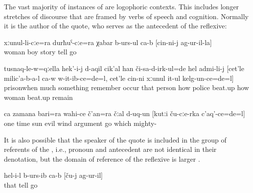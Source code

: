 The vast majority of instances of  are logophoric contexts. This includes longer stretches of discourse that are framed by verbs of speech and cognition. Normally it is the author of the quote, who serves as the antecedent of the reflexive:
%
\begin{exe}

		\ex	\label{ex:He is telling his wife and his son what had happened to him@4a}
		\gll	xːunul-li-cːe=ra	durħuˁ-cːe=ra	χabar	b-urs-ul	ca-b	[cin-ni-j	ag-ur-il-la]\\
			woman	boy	story	tell			go\\
		\glt	{}	

		\ex	\label{ex:When the man was in prison he remembered a lot, how the police beat}
		\gll	tusnaq-le-w=qːella	hek'-i-j	d-aqil	cik'al	han	či-sa-d-irk-ul=de	hel	admi-li-j	[cet'le	milic'a-b-a-l	ca-w	w-it-ib-ce=de=l,	cet'le	cin-ni	xːunul	it-ul	kelg-un-ce=de=l]\\
			prisonwhen		much	something	remember	occur	that	person	how	police		beat.up	how		woman	beat.up	remain\\
		\glt	{}	

	\ex	\label{ex:‎‎Once the sun and the evil wind argued about who is stronger}
	\gll	ca	zamana	bari=ra	wahi-ce	č'an=ra	čːal	d-uq-un	[kutːi	ču-cːe-rka	c'aq'-ce=de=l]\\
		one	time	sun	evil	wind	argument	go	which		mighty-\\
	\glt	{}
\end{exe}

It is also possible that the speaker of the quote is included in the group of referents of the , i.e., pronoun and antecedent are not identical in their denotation, but the domain of reference of the reflexive is larger .
%
\begin{exe}
	\ex	\label{ex:‎‎‎He told what had happened to them}
	\gll	hel-i-l	b-urs-ib	ca-b	[ču-j	ag-ur-il]\\
		that	tell			go\\
	\glt	{}
\end{exe}

